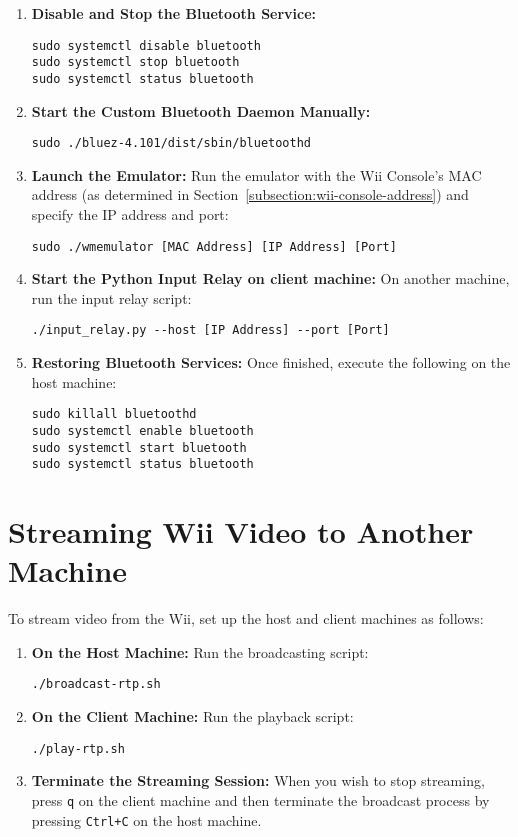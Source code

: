 \begin{enumerate}
	\item \textbf{Disable and Stop the Bluetooth Service:}
	      \begin{verbatim}
sudo systemctl disable bluetooth
sudo systemctl stop bluetooth
sudo systemctl status bluetooth
    \end{verbatim}

	\item \textbf{Start the Custom Bluetooth Daemon Manually:}
	      \begin{verbatim}
sudo ./bluez-4.101/dist/sbin/bluetoothd
    \end{verbatim}

	\item \textbf{Launch the Emulator:}
	      Run the emulator with the Wii Console's MAC address (as determined in Section~\ref{subsection:wii-console-address})
	      and specify the IP address and port:
	      \begin{verbatim}
sudo ./wmemulator [MAC Address] [IP Address] [Port]
    \end{verbatim}

	\item \textbf{Start the Python Input Relay on client machine:}
	      On another machine, run the input relay script:
	      \begin{verbatim}
./input_relay.py --host [IP Address] --port [Port]
\end{verbatim}


	\item \textbf{Restoring Bluetooth Services:}
	      Once finished, execute the following on the host machine:
	      \begin{verbatim}
sudo killall bluetoothd
sudo systemctl enable bluetooth
sudo systemctl start bluetooth
sudo systemctl status bluetooth
    \end{verbatim}
\end{enumerate}

\section{Streaming Wii Video to Another Machine}

To stream video from the Wii, set up the host and client machines as follows:

\begin{enumerate}
	\item \textbf{On the Host Machine:}
	      Run the broadcasting script:
	      \begin{verbatim}
./broadcast-rtp.sh
    \end{verbatim}

	\item \textbf{On the Client Machine:}
	      Run the playback script:
	      \begin{verbatim}
./play-rtp.sh
    \end{verbatim}


	\item \textbf{Terminate the Streaming Session:}
	      When you wish to stop streaming, press \texttt{q} on the client machine and then terminate the broadcast process by pressing \texttt{Ctrl+C} on the host machine.
\end{enumerate}
